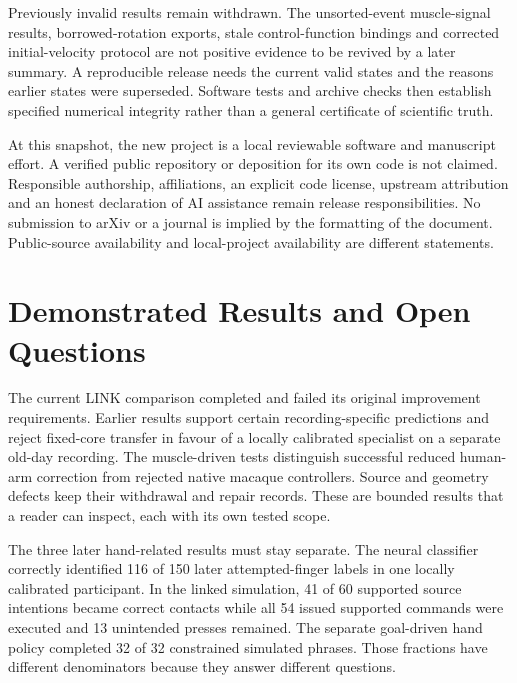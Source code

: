 Previously invalid results remain withdrawn. The unsorted-event muscle-signal results, borrowed-rotation exports, stale control-function bindings and corrected initial-velocity protocol are not positive evidence to be revived by a later summary. A reproducible release needs the current valid states and the reasons earlier states were superseded. Software tests and archive checks then establish specified numerical integrity rather than a general certificate of scientific truth.

At this snapshot, the new project is a local reviewable software and manuscript effort. A verified public repository or deposition for its own code is not claimed. Responsible authorship, affiliations, an explicit code license, upstream attribution and an honest declaration of AI assistance remain release responsibilities. No submission to arXiv or a journal is implied by the formatting of the document. Public-source availability and local-project availability are different statements.






\section{Demonstrated Results and Open Questions}

The current LINK comparison completed and failed its original improvement
requirements. Earlier results support certain recording-specific predictions
and reject fixed-core transfer in favour of a locally calibrated specialist
on a separate old-day recording. The muscle-driven tests distinguish successful
reduced human-arm correction from rejected native macaque controllers. Source
and geometry defects keep their withdrawal and repair records. These are
bounded results that a reader can inspect, each with its own tested scope.

The three later hand-related results must stay separate. The neural classifier
correctly identified 116 of 150 later attempted-finger labels in one locally
calibrated participant. In the linked simulation, 41 of 60 supported source
intentions became correct contacts while all 54 issued supported commands were
executed and 13 unintended presses remained. The separate goal-driven hand
policy completed 32 of 32 constrained simulated phrases. Those fractions have
different denominators because they answer different questions.

